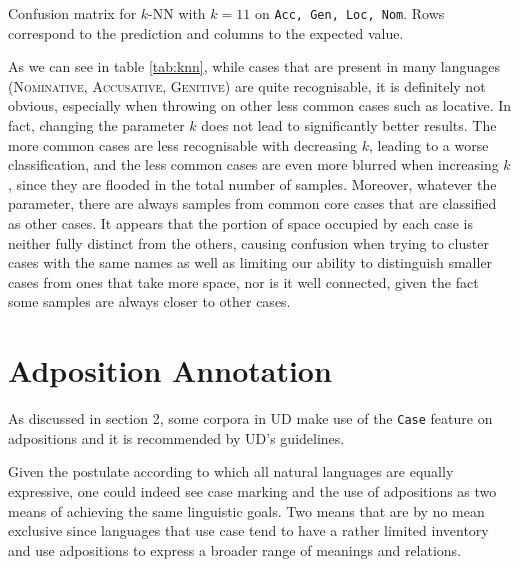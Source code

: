 \documentclass[11pt]{article}
\newcommand{\scsf}[1]{\textsc{\textsf{#1}}} %
\begin{document}
\begin{table}[h]
\medskip

\pgfplotscolorbardrawstandalone[%
  colorbar style={
    ticklabel style={
      font=\tiny,
      /pgf/number format/precision=3,
      /pgf/number format/relative*=4,
    },
  },
  colorbar horizontal,
  colormap access=const,
   point meta min=0, point meta max=250]
	\caption{Confusion matrix for $k$-NN with $k = 11$ on \texttt{Acc, Gen, Loc, Nom}.
 Rows correspond to the prediction and columns to the expected value.}
	\label{tab:knn}
\end{table}

As we can see in table \ref{tab:knn}, while cases that are present in many languages (\scsf{Nominative, Accusative, Genitive}) are quite recognisable, it is definitely not obvious, especially when throwing on other less common cases such as locative.
In fact, changing the parameter $k$ does not lead to significantly better results.
The more common cases are less recognisable with decreasing $k$, leading to a worse classification, and the less common cases are even more blurred when increasing $k$, since they are flooded in the total number of samples.
Moreover, whatever the parameter, there are always samples from common core cases that are classified as other cases.
It appears that the portion of space occupied by each case is neither fully distinct from the others, causing confusion when trying to cluster cases with the same names as well as limiting our ability to distinguish smaller cases from ones that take more space, nor is it well connected, given the fact some samples are always closer to other cases.%

%

\section{Adposition Annotation}

As discussed in section 2, some corpora in UD make use of the \texttt{Case} feature on adpositions and it is recommended by UD's guidelines.

Given the postulate according to which all natural languages are equally expressive, one could indeed see case marking and the use of adpositions as two means of achieving the same linguistic goals.
Two means that are by no mean exclusive since languages that use case tend to have a rather limited inventory and use adpositions to express a broader range of meanings and relations.
\end{document}
